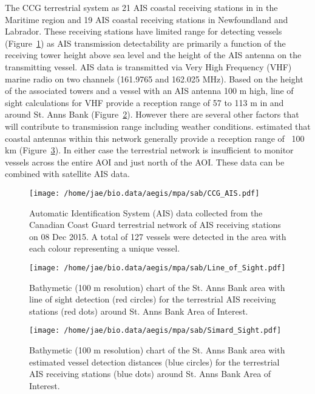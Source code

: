 \documentclass[letterpaper,portrait,11pt]{scrartcl}
\numberwithin{equation}{section}    %
\numberwithin{figure}{section}    %
\numberwithin{table}{section}       %
\begin{document}
The CCG terrestrial system as 21 AIS coastal receiving stations in in the Maritime region and 19 AIS coastal receiving stations in Newfoundland and Labrador.  These receiving stations have limited range for detecting vessels (Figure~\ref{fig:TAIS}) as AIS transmission detectability are primarily a function of the receiving tower height above sea level and the height of the AIS antenna on the transmitting vessel. AIS data is transmitted via Very High Frequency (VHF) marine radio on two channels (161.9765 and 162.025 MHz). Based on the height of the associated towers and a vessel with an AIS antenna 100 m high, line of sight calculations for VHF provide a reception range of  57 to 113 m in and around St. Anns Bank (Figure~\ref{fig:LOF}). However there are several other factors that will contribute to transmission range including weather conditions. \textcite{Simard2014shipping} estimated that coastal antennas within this network generally provide a reception range of ~100 km (Figure~\ref{fig:DetAIS}).  In either case the terrestrial network is insufficient to monitor vessels across the entire AOI and just north of the AOI. These data can be combined with satellite AIS data.


\begin{figure}[h]
  \centering
	\texttt{[image: /home/jae/bio.data/aegis/mpa/sab/CCG\_AIS.pdf]}
	\caption{Automatic Identification System (AIS) data collected from the Canadian Coast Guard terrestrial network of AIS receiving stations on 08 Dec 2015. A total of 127 vessels were detected in the area with each colour representing a unique vessel.}
  \label{fig:TAIS}
\end{figure}


\begin{figure}[h]
	\centering
	\texttt{[image: /home/jae/bio.data/aegis/mpa/sab/Line\_of\_Sight.pdf]}
	\caption{Bathymetic (100 m resolution) chart of the  St. Anns Bank area with line of sight detection (red circles) for the terrestrial AIS receiving stations (red dots) around St. Anns Bank Area of Interest.}
  \label{fig:LOF}
\end{figure}

\begin{figure}[h]
	\centering
	\texttt{[image: /home/jae/bio.data/aegis/mpa/sab/Simard\_Sight.pdf]}
	\caption{Bathymetic (100 m resolution) chart of the  St. Anns Bank area with  \textcite{Simard2014shipping} estimated vessel detection distances (blue circles) for the terrestrial AIS receiving stations (blue dots) around St. Anns Bank Area of Interest.}
  \label{fig:DetAIS}
\end{figure}
\end{document}

